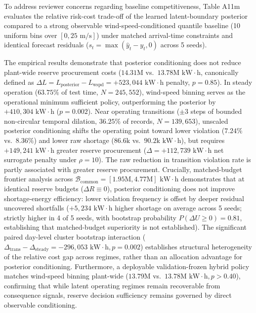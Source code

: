 \documentclass[
  journal]{IEEEtran}
\begin{document}
To address reviewer concerns regarding baseline competitiveness, Table
A11m evaluates the relative risk-cost trade-off of the learned
latent-boundary posterior compared to a strong observable
wind-speed-conditioned quantile baseline (10 uniform bins over
\([0, 25\text{ m/s}]\)) under matched arrival-time constraints and
identical forecast residuals (\(s_t = \max(\hat{y}_t - y_t, 0)\) across
5 seeds).

The empirical results demonstrate that posterior conditioning does not
reduce plant-wide reserve procurement costs (\(14.31\text{M}\)
vs.~\(13.78\text{M kW}\cdot\text{h}\), canonically defined as
\(\Delta L = L_{\text{posterior}} - L_{\text{wspd}} = +523{,}044\text{ kW}\cdot\text{h}\)
penalty, \(p=0.85\)). In steady operation (\(63.75\%\) of test time,
\(N=245{,}552\)), wind-speed binning serves as the operational minimum
sufficient policy, outperforming the posterior by
\(+410{,}304\text{ kW}\cdot\text{h}\) (\(p=0.002\)). Near operating
transitions (\(\pm 3\) steps of bounded non-circular temporal dilation,
\(36.25\%\) of records, \(N=139{,}653\)), unscaled posterior
conditioning shifts the operating point toward lower violation
(\(7.24\%\) vs.~\(8.36\%\)) and lower raw shortage (\(86.6\text{k}\)
vs.~\(90.2\text{k kW}\cdot\text{h}\)), but requires
\(+149{,}241\text{ kW}\cdot\text{h}\) greater reserve procurement
(\(\Delta = +112{,}739\text{ kW}\cdot\text{h}\) net surrogate penalty
under \(\rho=10\)). The raw reduction in transition violation rate is
partly associated with greater reserve procurement. Crucially,
matched-budget frontier analysis across
\(\mathcal{B}_{\text{common}} = [1.95\text{M}, 4.77\text{M}]\text{ kW}\cdot\text{h}\)
demonstrates that at identical reserve budgets (\(\Delta R \equiv 0\)),
posterior conditioning does not improve shortage-energy efficiency:
lower violation frequency is offset by deeper residual uncovered
shortfalls (\(+5{,}234\text{ kW}\cdot\text{h}\) higher shortage on
average across 5 seeds; strictly higher in 4 of 5 seeds, with bootstrap
probability \(P(\Delta U \ge 0) = 0.81\), establishing that
matched-budget superiority is not established). The significant paired
day-level cluster bootstrap interaction
(\(\Delta_{\text{trans}} - \Delta_{\text{steady}} = -296{,}053\text{ kW}\cdot\text{h}, p = 0.002\))
establishes structural heterogeneity of the relative cost gap across
regimes, rather than an allocation advantage for posterior conditioning.
Furthermore, a deployable validation-frozen hybrid policy matches
wind-speed binning plant-wide (\(13.79\text{M}\)
vs.~\(13.78\text{M kW}\cdot\text{h}, p > 0.40\)), confirming that while
latent operating regimes remain recoverable from consequence signals,
reserve decision sufficiency remains governed by direct observable
conditioning.
\end{document}
